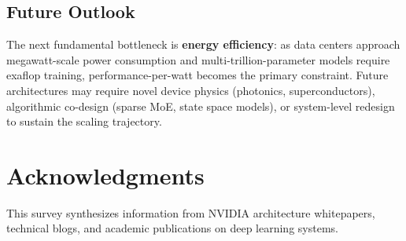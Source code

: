 \documentclass{article}
\begin{document}
\subsection{Future Outlook}

The next fundamental bottleneck is \textbf{energy efficiency}: as data centers approach megawatt-scale power consumption and multi-trillion-parameter models require exaflop training, performance-per-watt becomes the primary constraint. Future architectures may require novel device physics (photonics, superconductors), algorithmic co-design (sparse MoE, state space models), or system-level redesign to sustain the scaling trajectory.

\section*{Acknowledgments}

This survey synthesizes information from NVIDIA architecture whitepapers, technical blogs, and academic publications on deep learning systems.



\end{document}
